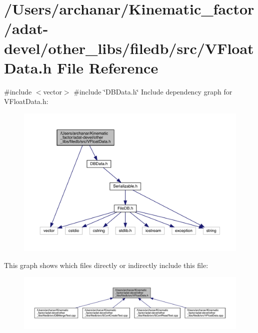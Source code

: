\hypertarget{adat-devel_2other__libs_2filedb_2src_2VFloatData_8h}{}\section{/\+Users/archanar/\+Kinematic\+\_\+factor/adat-\/devel/other\+\_\+libs/filedb/src/\+V\+Float\+Data.h File Reference}
\label{adat-devel_2other__libs_2filedb_2src_2VFloatData_8h}
{\ttfamily \#include $<$vector$>$}\newline
{\ttfamily \#include \char`\"{}D\+B\+Data.\+h\char`\"{}}\newline
Include dependency graph for V\+Float\+Data.\+h\+:
\nopagebreak
\begin{figure}[H]
\begin{center}
\leavevmode
\includegraphics[width=350pt]{d3/dbe/adat-devel_2other__libs_2filedb_2src_2VFloatData_8h__incl}
\end{center}
\end{figure}
This graph shows which files directly or indirectly include this file\+:
\nopagebreak
\begin{figure}[H]
\begin{center}
\leavevmode
\includegraphics[width=350pt]{d8/d03/adat-devel_2other__libs_2filedb_2src_2VFloatData_8h__dep__incl}
\end{center}
\end{figure}
